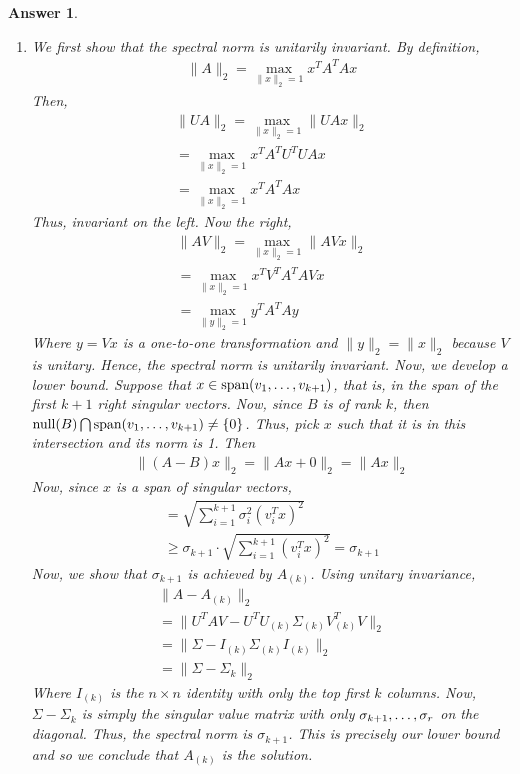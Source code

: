 \documentclass[12pt]{article}
\theoremstyle{colon}
\newtheorem*{answer}{Answer}
\begin{document}
\begin{answer}
\begin{enumerate}[label=\arabic*)]
    \item We first show that the spectral norm is unitarily invariant. By definition,
      \begin{gather*}
        \lVert A \rVert_2 = \max_{\lVert x \rVert_2 = 1} x^T A^T A x
      \end{gather*}
      Then,
      \begin{gather*}
        \lVert U A \rVert_2 = \max_{\lVert x \rVert_2 = 1} \lVert U A x \rVert_2 \\
        = \max_{\lVert x \rVert_2 = 1} x^T A^T U^T U A x \\
        = \max_{\lVert x \rVert_2 = 1} x^T A^T A x
      \end{gather*}
      Thus, invariant on the left. Now the right,
      \begin{gather*}
        \lVert A V \rVert_2 = \max_{\lVert x \rVert_2 = 1} \lVert A V x \rVert_2 \\
        = \max_{\lVert x \rVert_2 = 1} x^T V^T A^T A V x \\
        = \max_{\lVert y \rVert_2 = 1} y^T A^T A y
      \end{gather*}
      Where $y = V x$ is a one-to-one transformation and $\lVert y \rVert_2 = \lVert x \rVert_2$ because $V$ is unitary. Hence, the spectral norm is unitarily invariant. Now, we develop a lower bound. Suppose that $x \in \text{span}(v_1, \mathellipsis, v_{k+1})$, that is, in the span of the first $k+1$ right singular vectors. Now, since $B$ is of rank $k$, then $\text{null}(B) \bigcap \text{span}(v_1, \mathellipsis, v_{k+1}) \neq \{0\}$. Thus, pick $x$ such that it is in this intersection and its norm is 1. Then
      \begin{gather*}
        \lVert (A - B) x \rVert_2 = \lVert Ax + 0 \rVert_2 = \lVert A x \rVert_2
      \end{gather*}
      Now, since $x$ is a span of singular vectors,
      \begin{gather*}
        = \sqrt{\sum_{i=1}^{k+1} \sigma_i^2 (v_i^T x)^2} \\
        \geq \sigma_{k+1} \cdot \sqrt{\sum_{i=1}^{k+1} (v_i^T x)^2} = \sigma_{k+1}
      \end{gather*}
      Now, we show that $\sigma_{k+1}$ is achieved by $A_{(k)}$. Using unitary invariance,
      \begin{gather*}
        \lVert A - A_{(k)} \rVert_2 \\
        = \lVert U^T A V - U^T U_{(k)} \Sigma_{(k)} V_{(k)}^T V \rVert_2 \\
        = \lVert \Sigma - I_{(k)} \Sigma_{(k)} I_{(k)} \rVert_2 \\
        = \lVert \Sigma - \Sigma_{k} \rVert_2
      \end{gather*}
      Where $I_{(k)}$ is the $n \times n$ identity with only the top first $k$ columns. Now, $\Sigma - \Sigma_{k}$ is simply the singular value matrix with only $\sigma_{k+1}, \mathellipsis, \sigma_r$ on the diagonal. Thus, the spectral norm is $\sigma_{k+1}$. This is precisely our lower bound and so we conclude that $A_{(k)}$ is the solution.


\end{enumerate}
\end{answer}
\end{document}

